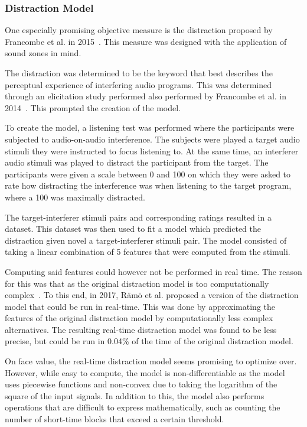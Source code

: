 \subsubsection{Distraction Model}
One especially promising objective measure is the distraction proposed by Francombe et al. in 2015~\cite{francombe2015model}.
This measure was designed with the application of sound zones in mind.

The distraction was determined to be the keyword that best describes the perceptual experience of 
interfering audio programs.
This was determined through an elicitation study performed also performed by Francombe et al. 
in 2014~\cite{francombe2014elicitation}.
This prompted the creation of the model.

To create the model, a listening test was performed where the participants were subjected to audio-on-audio interference.
The subjects were played a target audio stimuli they were instructed to focus listening to.
At the same time, an interferer audio stimuli was played to distract the participant from the target.
The participants were given a scale between 0 and 100 on which they were asked to rate how distracting the interference
was when listening to the target program, where a 100 was maximally distracted.

The target-interferer stimuli pairs and corresponding ratings resulted in a dataset.
This dataset was then used to fit a model which predicted the distraction given novel a target-interferer stimuli pair.
The model consisted of taking a linear combination of 5 features that were computed from the stimuli.

Computing said features could however not be performed in real time.
The reason for this was that as the original distraction model is too computationally complex~\cite{ramo2017real}.
To this end, in 2017, R\"am\"o et al. proposed a version of the distraction model that could be run in real-time.
This was done by approximating the features of the original distraction model by computationally less complex alternatives.
The resulting real-time distraction model was found to be less precise, but could be run in 0.04\% of the time of the 
original distraction model.

On face value, the real-time distraction model seems promising to optimize over.
However, while easy to compute, the model is non-differentiable as the model uses
piecewise functions and non-convex due to taking the logarithm of the square of the input signals.
In addition to this, the model also performs operations that are difficult to express mathematically, such as counting 
the number of short-time blocks that exceed a certain threshold.

